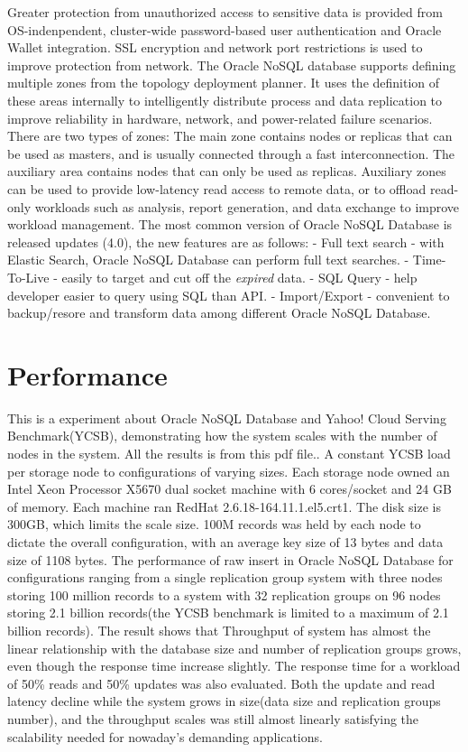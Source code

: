 Greater protection from unauthorized access to sensitive data is provided from OS-indenpendent, cluster-wide password-based user authentication and Oracle Wallet integration. SSL encryption and network port restrictions is used to improve protection from network. \cite{hid-sp18-515-editor01}
The Oracle NoSQL database supports defining multiple zones from the topology deployment planner. It uses the definition of these areas internally to intelligently distribute process and data replication to improve reliability in hardware, network, and power-related failure scenarios. There are two types of zones: The main zone contains nodes or replicas that can be used as masters, and is usually connected through a fast interconnection. The auxiliary area contains nodes that can only be used as replicas. Auxiliary zones can be used to provide low-latency read access to remote data, or to offload read-only workloads such as analysis, report generation, and data exchange to improve workload management.
The most common version of Oracle NoSQL Database is released updates (4.0), the new features are as follows:
- Full text search - with Elastic Search, Oracle NoSQL Database can perform full text searches.
- Time-To-Live - easily to target and cut off the \emph{expired} data.
- SQL Query - help developer easier to query using SQL than API.
- Import/Export - convenient to backup/resore and transform data among different Oracle NoSQL Database. \cite{hid-sp18-515-editor00}

\section{Performance}
This is a experiment about Oracle NoSQL Database and Yahoo! Cloud Serving Benchmark(YCSB), demonstrating how the system scales with the number of nodes in the system. All the results is from this pdf file.\cite{hid-sp18-515-editor02}.
A constant YCSB load per storage node to configurations of varying sizes. Each storage node owned an Intel Xeon Processor X5670 dual socket machine with 6 cores/socket and 24 GB of memory. Each machine ran RedHat 2.6.18-164.11.1.el5.crt1. The disk size is 300GB, which limits the scale size. 100M records was held by each node to dictate the overall configuration, with an average key size of 13 bytes and data size of 1108 bytes. 
The performance of raw insert in Oracle NoSQL Database for configurations ranging from a single replication group system with three nodes storing 100 million records to a system with 32 replication groups on 96 nodes storing 2.1 billion records(the YCSB benchmark is limited to a maximum of 2.1 billion records). The result shows that Throughput of system has almost the linear relationship with the database size and number of replication groups grows, even though the response time increase slightly. The response time for a workload of 50\% reads and 50\% updates was also evaluated. Both the update and read latency decline while the system grows in size(data size and replication groups number), and the throughput scales was still almost linearly satisfying the scalability needed for nowaday's demanding applications. 

